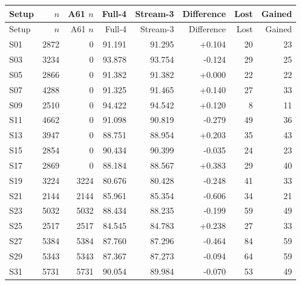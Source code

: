 \begin{longtable}{lrrrrrrr}
\toprule
Setup & $n$ & A61 $n$ & Full-4 & Stream-3 & Difference & Lost & Gained \\
\midrule
\endfirsthead
\toprule
Setup & $n$ & A61 $n$ & Full-4 & Stream-3 & Difference & Lost & Gained \\
\midrule
\endhead
S01 & 2872 & 0 & 91.191 & 91.295 & +0.104 & 20 & 23 \\
S03 & 3234 & 0 & 93.878 & 93.754 & -0.124 & 29 & 25 \\
S05 & 2866 & 0 & 91.382 & 91.382 & +0.000 & 22 & 22 \\
S07 & 4288 & 0 & 91.325 & 91.465 & +0.140 & 27 & 33 \\
S09 & 2510 & 0 & 94.422 & 94.542 & +0.120 & 8 & 11 \\
S11 & 4662 & 0 & 91.098 & 90.819 & -0.279 & 49 & 36 \\
S13 & 3947 & 0 & 88.751 & 88.954 & +0.203 & 35 & 43 \\
S15 & 2854 & 0 & 90.434 & 90.399 & -0.035 & 24 & 23 \\
S17 & 2869 & 0 & 88.184 & 88.567 & +0.383 & 29 & 40 \\
S19 & 3224 & 3224 & 80.676 & 80.428 & -0.248 & 41 & 33 \\
S21 & 2144 & 2144 & 85.961 & 85.354 & -0.606 & 34 & 21 \\
S23 & 5032 & 5032 & 88.434 & 88.235 & -0.199 & 59 & 49 \\
S25 & 2517 & 2517 & 84.545 & 84.783 & +0.238 & 27 & 33 \\
S27 & 5384 & 5384 & 87.760 & 87.296 & -0.464 & 84 & 59 \\
S29 & 5343 & 5343 & 87.367 & 87.273 & -0.094 & 64 & 59 \\
S31 & 5731 & 5731 & 90.054 & 89.984 & -0.070 & 53 & 49 \\
\bottomrule
\end{longtable}

